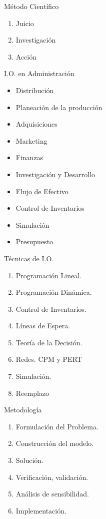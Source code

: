 \begin{frame}{Método Científico}
  \begin{enumerate} \justifying \parskip3mm
  \item Juicio
  \item Investigación
  \item Acción
  \end{enumerate}
\end{frame}

\begin{frame}{I.O. en Administración}
  \begin{itemize} \justifying \parskip3mm
  \item<only@1> Distribución
  \item<only@1> Planeación de la producción
  \item<only@1> Adquisiciones
  \item<only@1> Marketing
  \item<only@1> Finanzas
  \item<only@1> Investigación y Desarrollo
  \item<only@2>  Flujo de Efectivo
  \item<only@2> Control de Inventarios
  \item<only@2> Simulación
  \item<only@2> Presupuesto  
  \end{itemize}
\end{frame}


\begin{frame}{Técnicas de I.O.}
  
\begin{enumerate} \justifying \parskip2mm
\item Programación Lineal.
\item Programación Dinámica.
\item Control de Inventarios.
\item Líneas de Espera.
\item Teoría de la Decisión.
\item Redes. CPM y PERT
\item Simulación.
\item Reemplazo
\end{enumerate}
\end{frame}

\begin{frame}{Metodología}
  \begin{enumerate} \justifying \parskip3mm
  \item Formulación del Problema.
  \item Construcción del modelo.
  \item Solución.
  \item Verificación, validación. 
  \item Análisis de sensibilidad.
  \item Implementación.
  \end{enumerate}
\end{frame}

